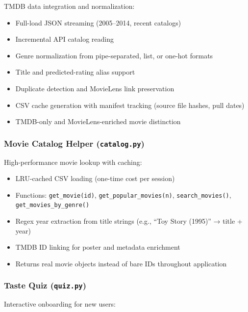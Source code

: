 \documentclass[11pt,a4paper]{article}
\begin{document}
TMDB data integration and normalization:

\begin{itemize}
    \item Full-load JSON streaming (2005–2014, recent catalogs)
    \item Incremental API catalog reading
    \item Genre normalization from pipe-separated, list, or one-hot formats
    \item Title and predicted-rating alias support
    \item Duplicate detection and MovieLens link preservation
    \item CSV cache generation with manifest tracking (source file hashes, pull dates)
    \item TMDB-only and MovieLens-enriched movie distinction
\end{itemize}

\subsubsection{Movie Catalog Helper (\texttt{catalog.py})}

High-performance movie lookup with caching:

\begin{itemize}
    \item LRU-cached CSV loading (one-time cost per session)
    \item Functions: \texttt{get\_movie(id)}, \texttt{get\_popular\_movies(n)}, \texttt{search\_movies()}, \texttt{get\_movies\_by\_genre()}
    \item Regex year extraction from title strings (e.g., ``Toy Story (1995)'' → title + year)
    \item TMDB ID linking for poster and metadata enrichment
    \item Returns real movie objects instead of bare IDs throughout application
\end{itemize}

\subsubsection{Taste Quiz (\texttt{quiz.py})}

Interactive onboarding for new users:
\end{document}

